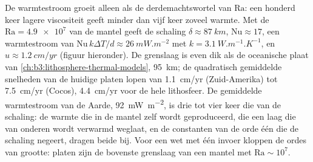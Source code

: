 De warmtestroom groeit alleen als de derdemachtswortel van $\mathrm{Ra}$: een honderd keer
lagere viscositeit geeft minder dan vijf keer zoveel warmte. Met de
$\mathrm{Ra} = \num{4.9e7}$ van de mantel geeft de schaling $\delta \approx \qty{87}{km}$,
$\mathrm{Nu} \approx 17$, een warmtestroom van $\mathrm{Nu}\,k\Delta T/d \approx
\qty{26}{mW.m^{-2}}$ met $k = \qty{3.1}{W.m^{-1}.K^{-1}}$, en $u \approx
\qty{1.2}{cm/yr}$ (figuur hieronder). De grenslaag is even dik als de
oceanische plaat van \cref{ch:b3:lithosphere-thermal-models}, \qty{95}{km}; de
quadratisch gemiddelde snelheden van de huidige platen lopen van \qty{1.1}{cm/yr}
(Zuid-Amerika) tot \qty{7.5}{cm/yr} (Cocos), \qty{4.4}{cm/yr} voor de hele
lithosfeer. De gemiddelde warmtestroom van de Aarde, \qty{92}{mW.m^{-2}}, is drie tot vier
keer die van de schaling: de warmte die in de mantel zelf wordt geproduceerd, die een laag
die van onderen wordt verwarmd weglaat, en de constanten van de orde één die de schaling
negeert, dragen beide bij. Voor een wet met één invoer kloppen de ordes van grootte:
platen zijn de bovenste grenslaag van een mantel met $\mathrm{Ra}
\sim 10^7$.

